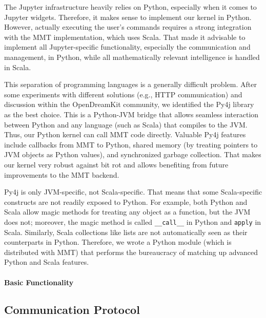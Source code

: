 The Jupyter infrastructure heavily relies on Python, especially when it comes to Jupyter widgets.
Therefore, it makes sense to implement our kernel in Python.
However, actually executing the user's commands requires a strong integration with the MMT implementation, which uses Scala.
That made it advisable to implement all Jupyter-specific functionality, especially the communication and management, in Python, while all mathematically relevant intelligence is handled in Scala.

This separation of programming languages is a generally difficult problem.
After some experiments with different solutions (e.g., HTTP communication) and discussion within the OpenDreamKit community, we identified the Py4j library~\cite{Py4j} as the best choice.
This is a Python-JVM bridge that allows seamless interaction between Python and any language (such as Scala) that compiles to the JVM.
Thus, our Python kernel can call MMT code directly.
Valuable Py4j features include callbacks from MMT to Python, shared memory (by treating pointers to JVM objects as Python values), and synchronized garbage collection.
That makes our kernel very robust against bit rot and allows benefiting from future improvements to the MMT backend.

Py4j is only JVM-specific, not Scala-specific.
That means that some Scala-specific constructs are not readily exposed to Python.
For example, both Python and Scala allow magic methods for treating any object as a function, but the JVM does not; moreover, the magic method is called \texttt{\_\_call\_\_} in Python and \texttt{apply} in Scala.
Similarly, Scala collections like lists are not automatically seen as their counterparts in Python.
Therefore, we wrote a Python module (which is distributed with MMT) that performs the bureaucracy of matching up advanced Python and Scala features.

\paragraph{Basic Functionality}


\subsection{Communication Protocol}

